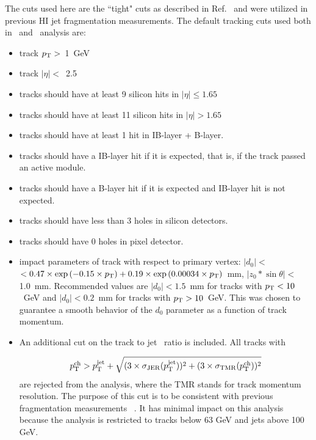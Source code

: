 The cuts used here are the ``tight" cuts as described in Ref.~\cite{ref:tracktwiki} and were utilized in previous HI jet fragmentation measurements.
The default tracking cuts used both in \pp\ and \PbPb\ analysis are:
\begin{itemize}
\item{ track $\mbox{$p_{\mathrm{T}}$}>$~1~GeV}
\item{ track $|\eta|<$~2.5}
\item{ tracks should have at least 9 silicon hits in $|\eta|\leq1.65$}
\item{ tracks should have at least 11 silicon hits in $|\eta|>1.65$}
\item{ tracks should have at least 1 hit in IB-layer + B-layer.}
\item{ tracks should have a IB-layer hit if it is expected, that is, if the track passed an active module.}
\item{ tracks should have a B-layer hit if it is expected and IB-layer hit is not expected.}
\item{ tracks should have  less than 3 holes in silicon detectors.}
\item{ tracks should have 0 holes in pixel detector.}
\item{ impact parameters of track with respect to primary vertex:  $|d_0|<$$< 0.47\times \exp{(-0.15\times\mbox{$p_{\mathrm{T}}$})} + 0.19\times \exp{(0.00034\times\mbox{$p_{\mathrm{T}}$})}$~mm, $|z_0*\sin\theta|<$1.0~mm.
Recommended values are  $|d_0| < 1.5$~mm for tracks with $\mbox{$p_{\mathrm{T}}$}<10$~GeV and $|d_0| < 0.2$~mm for tracks with $\mbox{$p_{\mathrm{T}}$}>10$~GeV.
This was chosen to guarantee a smooth behavior of the $d_{0}$ parameter as a function of track momentum.}
\item{ An additional cut on the track to jet \pT\ ratio is included.
All tracks with 

\begin{equation}
\mbox{$p_{{\mathrm{T}}}^{\mathrm{ch}}$} >  \mbox{$p_{\mathrm{T}}^{\mathrm{jet}}$} + \sqrt{ (3 \times \sigma_{\mathrm{JER}}(\mbox{$p_{\mathrm{T}}^{\mathrm{jet}}$}))^2 + (3 \times \sigma_{\mathrm{TMR}}(\mbox{$p_{{\mathrm{T}}}^{\mathrm{ch}}$}))^2} 
\end{equation}
are rejected from the analysis, where the TMR stands for track momentum resolution.
The purpose of this cut is to be consistent with previous fragmentation measurements ~\cite{PhysRevC.98.024908}.
It has minimal impact on this analysis because the analysis is restricted to tracks below 63 GeV and jets above 100 GeV.}
\end{itemize}


